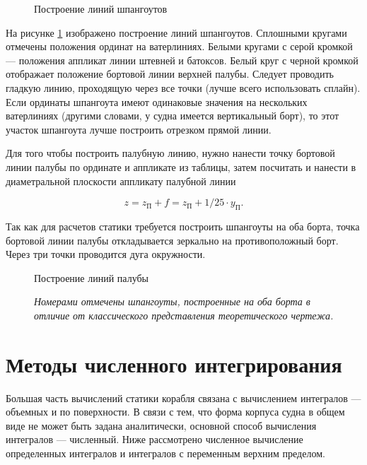 \begin{figure}[h!]
    \centerline{}
    \caption{Построение линий шпангоутов}
    \label{fig:lines-curves}
\end{figure}


На рисунке \ref{fig:lines-curves} изображено построение линий шпангоутов.
Сплошными кругами отмечены положения ординат на ватерлиниях.
Белыми кругами с серой кромкой --- положения аппликат линии штевней и батоксов.
Белый круг с черной кромкой отображает положение бортовой линии верхней палубы.
Следует проводить гладкую линию, проходящую через все точки (лучше всего использовать сплайн).
Если ординаты шпангоута имеют одинаковые значения на нескольких ватерлиниях (другими словами, у судна имеется вертикальный борт), то этот участок шпангоута лучше построить отрезком прямой линии.

Для того чтобы построить палубную линию, нужно нанести точку бортовой линии палубы  по ординате и аппликате из таблицы, затем посчитать и нанести в диаметральной плоскости аппликату палубной линии

\begin{equation}
    z = z_{\text{П}} + f = z_{\text{П}} + 1/25 \cdot y_{\text{П}}.
\end{equation}

Так как для расчетов статики требуется построить шпангоуты на оба борта, точка бортовой линии палубы откладывается зеркально на противоположный борт.
Через три точки проводится дуга окружности.

\begin{figure}[h!]
    \centerline{}
    \caption{Построение линий палубы}
    \label{fig:lines-curves-deck}
\end{figure}

\begin{figure}[h!]
    \centerline{}
    \caption{Вспомогательный теоретический чертеж}
    \caption*{\textit{Номерами отмечены шпангоуты, построенные на оба борта в отличие от классического представления теоретического чертежа.}}
    \label{fig:lines}
\end{figure}

\section{Методы численного интегрирования}

Большая часть вычислений статики корабля связана с вычислением интегралов --- объемных и по поверхности.
В связи с тем, что форма корпуса судна в общем виде не может быть задана аналитически, основной способ вычисления интегралов --- численный.
Ниже рассмотрено численное вычисление определенных интегралов и интегралов с переменным верхним пределом.

